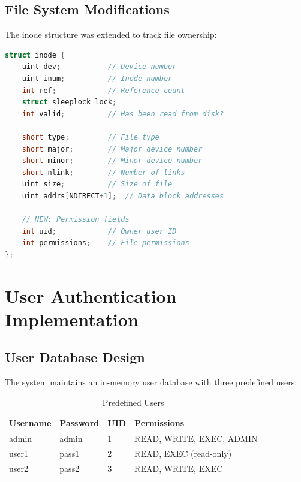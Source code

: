 \documentclass[a4paper,12pt]{report}
\begin{document}
\section{File System Modifications}

The inode structure was extended to track file ownership:

\begin{lstlisting}[language=C, caption=Enhanced Inode Structure]
struct inode {
    uint dev;           // Device number
    uint inum;          // Inode number
    int ref;            // Reference count
    struct sleeplock lock;
    int valid;          // Has been read from disk?
    
    short type;         // File type
    short major;        // Major device number
    short minor;        // Minor device number
    short nlink;        // Number of links
    uint size;          // Size of file
    uint addrs[NDIRECT+1];  // Data block addresses
    
    // NEW: Permission fields
    int uid;            // Owner user ID
    int permissions;    // File permissions
};
\end{lstlisting}

\newpage

\chapter{User Authentication Implementation}
\thispagestyle{contentpages}
\justifying

\section{User Database Design}

The system maintains an in-memory user database with three predefined users:

\begin{table}[H]
\centering
\begin{tabular}{|l|l|l|p{5cm}|}
\hline
\textbf{Username} & \textbf{Password} & \textbf{UID} & \textbf{Permissions} \\
\hline
admin & admin & 1 & READ, WRITE, EXEC, ADMIN \\
user1 & pass1 & 2 & READ, EXEC (read-only) \\
user2 & pass2 & 3 & READ, WRITE, EXEC \\
\hline
\end{tabular}
\caption{Predefined Users}
\label{tab:users}
\end{table}
\end{document}
